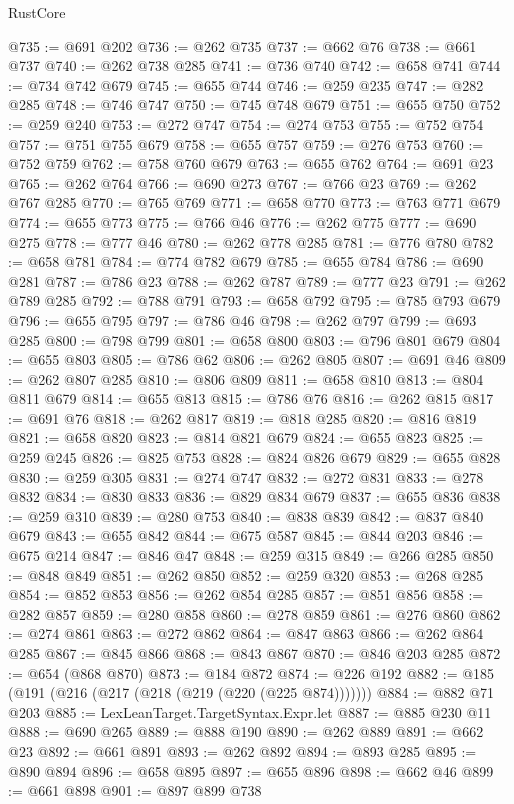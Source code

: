 \begin{lexlean}{RustCore}
\begin{coremodule}
@735 := @691 @202
@736 := @262 @735
@737 := @662 @76
@738 := @661 @737
@740 := @262 @738 @285
@741 := @736 @740
@742 := @658 @741
@744 := @734 @742 @679
@745 := @655 @744
@746 := @259 @235
@747 := @282 @285
@748 := @746 @747
@750 := @745 @748 @679
@751 := @655 @750
@752 := @259 @240
@753 := @272 @747
@754 := @274 @753
@755 := @752 @754
@757 := @751 @755 @679
@758 := @655 @757
@759 := @276 @753
@760 := @752 @759
@762 := @758 @760 @679
@763 := @655 @762
@764 := @691 @23
@765 := @262 @764
@766 := @690 @273
@767 := @766 @23
@769 := @262 @767 @285
@770 := @765 @769
@771 := @658 @770
@773 := @763 @771 @679
@774 := @655 @773
@775 := @766 @46
@776 := @262 @775
@777 := @690 @275
@778 := @777 @46
@780 := @262 @778 @285
@781 := @776 @780
@782 := @658 @781
@784 := @774 @782 @679
@785 := @655 @784
@786 := @690 @281
@787 := @786 @23
@788 := @262 @787
@789 := @777 @23
@791 := @262 @789 @285
@792 := @788 @791
@793 := @658 @792
@795 := @785 @793 @679
@796 := @655 @795
@797 := @786 @46
@798 := @262 @797
@799 := @693 @285
@800 := @798 @799
@801 := @658 @800
@803 := @796 @801 @679
@804 := @655 @803
@805 := @786 @62
@806 := @262 @805
@807 := @691 @46
@809 := @262 @807 @285
@810 := @806 @809
@811 := @658 @810
@813 := @804 @811 @679
@814 := @655 @813
@815 := @786 @76
@816 := @262 @815
@817 := @691 @76
@818 := @262 @817
@819 := @818 @285
@820 := @816 @819
@821 := @658 @820
@823 := @814 @821 @679
@824 := @655 @823
@825 := @259 @245
@826 := @825 @753
@828 := @824 @826 @679
@829 := @655 @828
@830 := @259 @305
@831 := @274 @747
@832 := @272 @831
@833 := @278 @832
@834 := @830 @833
@836 := @829 @834 @679
@837 := @655 @836
@838 := @259 @310
@839 := @280 @753
@840 := @838 @839
@842 := @837 @840 @679
@843 := @655 @842
@844 := @675 @587
@845 := @844 @203
@846 := @675 @214
@847 := @846 @47
@848 := @259 @315
@849 := @266 @285
@850 := @848 @849
@851 := @262 @850
@852 := @259 @320
@853 := @268 @285
@854 := @852 @853
@856 := @262 @854 @285
@857 := @851 @856
@858 := @282 @857
@859 := @280 @858
@860 := @278 @859
@861 := @276 @860
@862 := @274 @861
@863 := @272 @862
@864 := @847 @863
@866 := @262 @864 @285
@867 := @845 @866
@868 := @843 @867
@870 := @846 @203 @285
@872 := @654 (@868 @870)
@873 := @184 @872
@874 := @226 @192
@882 := @185 (@191 (@216 (@217 (@218 (@219 (@220 (@225 @874)))))))
@884 := @882 @71 @203
@885 := LexLeanTarget.TargetSyntax.Expr.let
@887 := @885 @230 @11
@888 := @690 @265
@889 := @888 @190
@890 := @262 @889
@891 := @662 @23
@892 := @661 @891
@893 := @262 @892
@894 := @893 @285
@895 := @890 @894
@896 := @658 @895
@897 := @655 @896
@898 := @662 @46
@899 := @661 @898
@901 := @897 @899 @738

\end{coremodule}
\end{lexlean}
